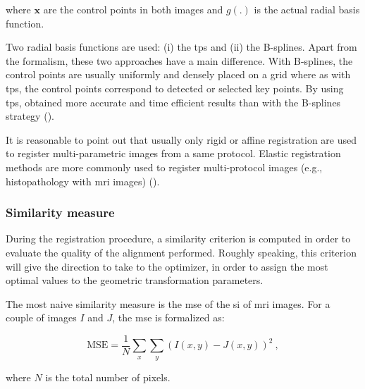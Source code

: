 \noindent where $\mathbf{x}$ are the control points in both images and $g(.)$ is the actual radial basis function. 

Two radial basis functions are used: (i) the \ac{tps} and (ii) the B-splines. Apart from the formalism, these two approaches have a main difference. With B-splines, the control points are usually uniformly and densely placed on a grid where as with \ac{tps}, the control points correspond to detected or selected key points. By using \ac{tps}, \cite{Mitra2011} obtained more accurate and time efficient results than with the B-splines strategy (\cite{Mitra2012a}).

It is reasonable to point out that usually only rigid or affine registration are used to register multi-parametric images from a same protocol. Elastic registration methods are more commonly used to register multi-protocol images (e.g., histopathology with \ac{mri} images) (\cite{Toth2008,Toth2009}).

\subsubsection{Similarity measure}\label{subsubsec:simmea}

During the registration procedure, a similarity criterion is computed in order to evaluate the quality of the alignment performed. Roughly speaking, this criterion will give the direction to take to the optimizer, in order to assign the most optimal values to the geometric transformation parameters.

The most naive similarity measure is the \acf{mse} of the \ac{si} of \ac{mri} images. For a couple of images $I$ and $J$, the \ac{mse} is formalized as:

\begin{equation}
	\text{MSE} =\frac{1}{N} \sum_x \sum_y ( I(x,y) - J(x,y) )^2 \ ,
	\label{eq:mse}
\end{equation}

\noindent where $N$ is the total number of pixels.

